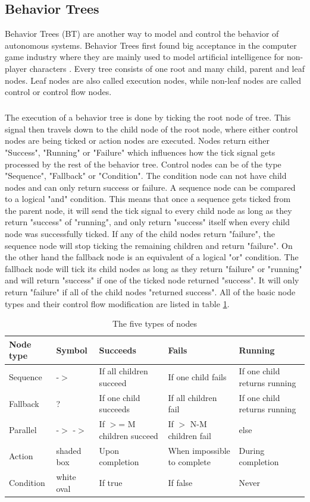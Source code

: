 \subsection{Behavior Trees}
Behavior Trees (BT) are another way to model and control the behavior of autonomous systems. Behavior Trees first found big acceptance in the computer game industry where they are mainly used to model artificial intelligence for non-player characters \cite{florez2009}. Every tree consists of one root and many child, parent and leaf nodes. Leaf nodes are also called execution nodes, while non-leaf nodes are called control or control flow nodes. 
\subparagraph*{}
The execution of a behavior tree is done by ticking the root node of tree. This signal then travels down to the child node of the root node, where either control nodes are being ticked or action nodes are executed. Nodes return either "Success", "Running" or "Failure" which influences how the tick signal gets processed by the rest of the behavior tree. Control nodes can be of the type "Sequence", "Fallback" or "Condition". The condition node can not have child nodes and can only return success or failure. A sequence node can be compared to a logical "and" condition. This means that once a sequence gets ticked from the parent node, it will send the tick signal to every child node as long as they return "success" of "running", and only return "success" itself when every child node was successfully ticked. If any of the child nodes return "failure", the sequence node will stop ticking the remaining children and return "failure". On the other hand the fallback node is an equivalent of a logical "or" condition. The fallback node will tick its child nodes as long as they return "failure" or "running" and will return "success" if one of the ticked node returned "success". It will only return "failure" if all of the child nodes "returned success". All of the basic node types and their control flow modification are listed in table \ref{tab:node_types}.

\begin{table}[ht]
	\label{tab:node_types}
	\caption{The five types of nodes \cite{iovino2022}}
	\begin{tabular}{ | m{} | m{}| m{} | m{} | m{} |} 
  	\hline
  	Node type & Symbol & Succeeds & Fails & Running \\ 
  	\hline
  	Sequence & -$>$ & If all children succeed &  If one child fails & If one child returns running \\ 
  	\hline
  	Fallback & ? & If one child succeeds & If all children fail & If one child returns running \\ 
  	\hline
  	Parallel & -$>$ -$>$ & If $>$= M children succeed & If $>$ N-M children fail & else \\
  	\hline
  	Action & shaded box & Upon completion & When impossible to complete & During completion \\
  	\hline
  	Condition & white oval & If true & If false & Never \\
  	\hline
	\end{tabular}
\end{table}


